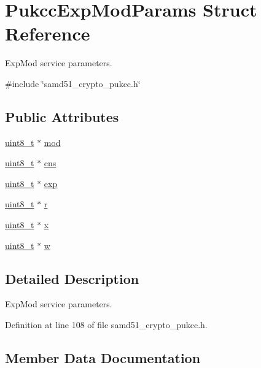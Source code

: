 \hypertarget{structPukccExpModParams}{}\section{Pukcc\+Exp\+Mod\+Params Struct Reference}
\label{structPukccExpModParams}


Exp\+Mod service parameters.  




{\ttfamily \#include \char`\"{}samd51\+\_\+crypto\+\_\+pukcc.\+h\char`\"{}}

\subsection*{Public Attributes}
\begin{DoxyCompactItemize}
\item 
\hyperlink{stdint_8h_aba7bc1797add20fe3efdf37ced1182c5}{uint8\+\_\+t} $\ast$ \hyperlink{structPukccExpModParams_af176be1f82564603bba8637782bbffe2}{mod}
\item 
\hyperlink{stdint_8h_aba7bc1797add20fe3efdf37ced1182c5}{uint8\+\_\+t} $\ast$ \hyperlink{structPukccExpModParams_a288aba4aaee5cc6bc89bcab0f7faa28b}{cns}
\item 
\hyperlink{stdint_8h_aba7bc1797add20fe3efdf37ced1182c5}{uint8\+\_\+t} $\ast$ \hyperlink{structPukccExpModParams_afcf095e646200687b7771a108d001249}{exp}
\item 
\hyperlink{stdint_8h_aba7bc1797add20fe3efdf37ced1182c5}{uint8\+\_\+t} $\ast$ \hyperlink{structPukccExpModParams_aa5d6ccb73961725de58d96d15047392c}{r}
\item 
\hyperlink{stdint_8h_aba7bc1797add20fe3efdf37ced1182c5}{uint8\+\_\+t} $\ast$ \hyperlink{structPukccExpModParams_a50fa133f87c6d181134a98337b13202b}{x}
\item 
\hyperlink{stdint_8h_aba7bc1797add20fe3efdf37ced1182c5}{uint8\+\_\+t} $\ast$ \hyperlink{structPukccExpModParams_a7f91b881310c040369e0c7a063160d30}{w}
\end{DoxyCompactItemize}


\subsection{Detailed Description}
Exp\+Mod service parameters. 

Definition at line 108 of file samd51\+\_\+crypto\+\_\+pukcc.\+h.



\subsection{Member Data Documentation}
\mbox{\label{structPukccExpModParams_a288aba4aaee5cc6bc89bcab0f7faa28b}} 
